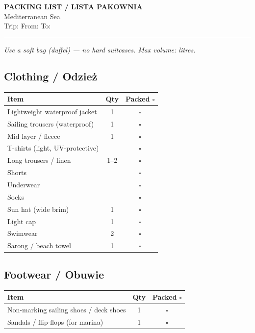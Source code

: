 \documentclass[a4paper,11pt]{article}
\begin{document}

\begin{center}
    {\Large\bfseries\color{pzzblue} PACKING LIST / LISTA PAKOWNIA}\\
    {\large Mediterranean Sea}\\[4pt]
    {\small Trip: \field{5cm} \quad From: \field{3cm} \quad To: \field{3cm}}
\end{center}

\vspace{0.3cm}
\noindent\rule{\linewidth}{1pt}

\noindent\textit{Use a soft bag (duffel) — no hard suitcases. Max volume: \field{2cm} litres.}

\vspace{0.2cm}

\subsection*{Clothing / Odzież}
\begin{tabularx}{\linewidth}{|X|c|c|}
\hline
\textbf{Item} & \textbf{Qty} & \textbf{Packed \(\square\)} \\
\hline
Lightweight waterproof jacket & 1 & \(\square\) \\[4pt]\hline
Sailing trousers (waterproof) & 1 & \(\square\) \\[4pt]\hline
Mid layer / fleece & 1 & \(\square\) \\[4pt]\hline
T-shirts (light, UV-protective) & & \(\square\) \\[4pt]\hline
Long trousers / linen & 1--2 & \(\square\) \\[4pt]\hline
Shorts & & \(\square\) \\[4pt]\hline
Underwear & & \(\square\) \\[4pt]\hline
Socks & & \(\square\) \\[4pt]\hline
Sun hat (wide brim) & 1 & \(\square\) \\[4pt]\hline
Light cap & 1 & \(\square\) \\[4pt]\hline
Swimwear & 2 & \(\square\) \\[4pt]\hline
Sarong / beach towel & 1 & \(\square\) \\[4pt]\hline
\end{tabularx}

\vspace{0.3cm}

\subsection*{Footwear / Obuwie}
\begin{tabularx}{\linewidth}{|X|c|c|}
\hline
\textbf{Item} & \textbf{Qty} & \textbf{Packed \(\square\)} \\
\hline
Non-marking sailing shoes / deck shoes & 1 & \(\square\) \\[4pt]\hline
Sandals / flip-flops (for marina) & 1 & \(\square\) \\[4pt]\hline
\end{tabularx}
\end{document}
